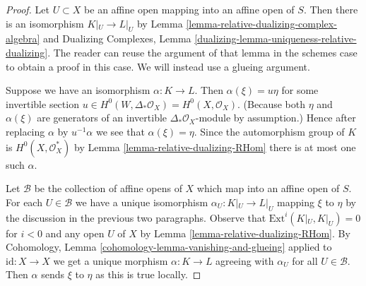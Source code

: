 \documentclass[10pt,a4paper]{amsart}
\theoremstyle{plain}
\theoremstyle{definition}
\theoremstyle{remark}
\numberwithin{equation}{subsection}
\begin{document}
\begin{proof}
Let $U \subset X$ be an affine open mapping into an
affine open of $S$. Then there is an isomorphism
$K|_U \to L|_U$ by Lemma \ref{lemma-relative-dualizing-complex-algebra} and
Dualizing Complexes, Lemma
\ref{dualizing-lemma-uniqueness-relative-dualizing}.
The reader can reuse the argument of that lemma
in the schemes case to obtain a proof in this case.
We will instead use a glueing argument.

\medskip\noindent
Suppose we have an isomorphism $\alpha : K \to L$.
Then $\alpha(\xi) = u \eta$ for some invertible section
$u \in H^0(W, \Delta_*\mathcal{O}_X) = H^0(X, \mathcal{O}_X)$.
(Because both $\eta$ and $\alpha(\xi)$ are generators
of an invertible $\Delta_*\mathcal{O}_X$-module by assumption.)
Hence after replacing $\alpha$ by $u^{-1}\alpha$
we see that $\alpha(\xi) = \eta$.
Since the automorphism group of
$K$ is $H^0(X, \mathcal{O}_X^*)$ by Lemma \ref{lemma-relative-dualizing-RHom}
there is at most one such $\alpha$.

\medskip\noindent
Let $\mathcal{B}$ be the collection of affine opens of
$X$ which map into an affine open of $S$. For each $U \in \mathcal{B}$
we have a unique isomorphism $\alpha_U : K|_U \to L|_U$
mapping $\xi$ to $\eta$ by the discussion in the previous
two paragraphs.
Observe that $\text{Ext}^i(K|_U, K|_U) = 0$ for $i < 0$
and any open $U$ of $X$ by Lemma \ref{lemma-relative-dualizing-RHom}.
By Cohomology, Lemma \ref{cohomology-lemma-vanishing-and-glueing}
applied to $\text{id} : X \to X$ we get a unique morphism
$\alpha : K \to L$ agreeing
with $\alpha_U$ for all $U \in \mathcal{B}$.
Then $\alpha$ sends $\xi$ to $\eta$ as this is true locally.
\end{proof}
\end{document}
